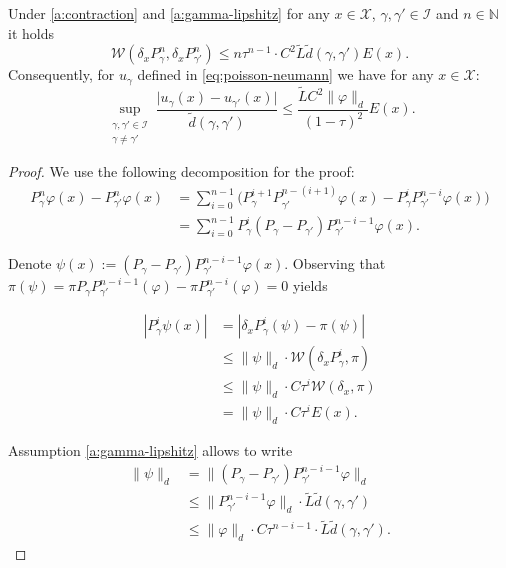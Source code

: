 \begin{lemma}
    Under \ref{a:contraction} and \ref{a:gamma-lipshitz} for any $x \in \mathcal{X}$, $\gamma, \gamma' \in \mathcal{I}$ and $n \in \mathbb{N}$ it holds
\[
    \mathcal{W}(\delta_xP_{\gamma}^n, \delta_xP_{\gamma'}^n) \leq n\tau^{n-1} \cdot C^2 \tilde{L}  \tilde{d}(\gamma, \gamma') E(x).
\]
    Consequently, for $u_\gamma$ defined in \eqref{eq:poisson-neumann} we have for any $x \in \mathcal{X}$:
\[
  \sup_{\substack{\gamma, \gamma' \in \mathcal{I} \\ \gamma \neq \gamma'}}\frac{\lvert u_\gamma(x) - u_{\gamma'}(x) \rvert}{\tilde{d}(\gamma, \gamma')} \leq \frac{\tilde{L} C^2 \| \varphi \|_d}{(1-\tau)^2} E(x).
\] 


\begin{proof}

    We use the following decomposition for the proof:
    \begin{align*}
    P_{\gamma}^n\varphi(x)-P_{\gamma'}^n\varphi(x)
    &=\sum_{i=0}^{n-1} \big(P_{\gamma}^{i+1}P_{\gamma'}^{n-(i+1)}\varphi(x)-P_{\gamma}^{i}P_{\gamma'}^{n-i}\varphi(x)\big)  \\
    &=\sum_{i=0}^{n-1} P_{\gamma}^{i}(P_{\gamma}-P_{\gamma'})P_{\gamma'}^{n-i-1}\varphi(x).
    \end{align*}

    Denote $\psi(x) := (P_{\gamma}-P_{\gamma'})P_{\gamma'}^{n-i-1} \varphi(x)$.
    Observing that $\pi(\psi) = \pi P_{\gamma}P_{\gamma'}^{n-i-1}(\varphi) - \pi P_{\gamma'}^{n-i}(\varphi) = 0$ yields

    \begin{align*}
        \left\vert P_{\gamma}^{i}\psi(x) \right\vert 
        &= \left\vert \delta_x P_{\gamma}^{i}(\psi) - \pi(\psi) \right\vert \\
        &\leq \| \psi \|_d \cdot \mathcal{W}(\delta_x P_{\gamma}^i, \pi) \\
        &\leq \| \psi \|_d \cdot C\tau^i \mathcal{W}(\delta_x, \pi) \\
        &= \| \psi \|_d \cdot C\tau^i E(x).
    \end{align*}
    
    Assumption \ref{a:gamma-lipshitz} allows to write
    \begin{align*}
        \| \psi \|_d 
        &= \| (P_{\gamma}-P_{\gamma'})P_{\gamma'}^{n-i-1} \varphi \|_d \\
        &\leq \| P_{\gamma'}^{n-i-1} \varphi \|_d \cdot \tilde{L}\tilde{d}(\gamma, \gamma') \\
        &\leq \| \varphi \|_d \cdot C\tau^{n-i-1} \cdot \tilde{L}\tilde{d}(\gamma, \gamma').
    \end{align*}


\end{proof}
\end{lemma}
